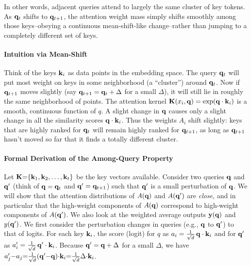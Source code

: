 In other words, adjacent queries attend to largely the same cluster of key tokens. As $\mathbf{q}_t$ shifts to $\mathbf{q}_{t+1}$, the attention weight mass simply shifts smoothly among those keys–obeying a continuous mean-shift-like change–rather than jumping to a completely different set of keys.

\paragraph{Intuition via Mean-Shift} Think of the keys ${\mathbf{k}_i}$ as data points in the embedding space. The query $\mathbf{q}_t$ will put most weight on keys in some neighborhood (a “cluster”) around $\mathbf{q}_t$. Now if $\mathbf{q}_{t+1}$ moves slightly (say $\mathbf{q}_{t+1} = \mathbf{q}_t + \Delta$ for a small $\Delta$), it will still lie in roughly the same neighborhood of points. The attention kernel $\mathbf{K}(x_i,\mathbf{q}) = \exp(\mathbf{q}\cdot \mathbf{k}_i)$ is a smooth, continuous function of $q$. A slight change in $\mathbf{q}$ causes only a slight change in all the similarity scores $\mathbf{q}\cdot \mathbf{k}_i$. Thus the weights $A_i$ shift slightly: keys that are highly ranked for $\mathbf{q}_t$ will remain highly ranked for $\mathbf{q}_{t+1}$, as long as $\mathbf{q}_{t+1}$ hasn’t moved so far that it finds a totally different cluster.


\paragraph{Formal Derivation of the Among-Query Property}
\label{sec:among-query-def}
Let $\mathbf{K}{=}\{\mathbf{k}_1, \mathbf{k}_2, \dots, \mathbf{k}_t\}$ be the key vectors available. Consider two queries $\mathbf{q}$ and $\mathbf{q}'$ (think of $\mathbf{q} = \mathbf{q}_t$ and $\mathbf{q}' = \mathbf{q}_{t+1}$) such that $\mathbf{q}'$ is a small perturbation of $\mathbf{q}$. We will show that the attention distributions of $A(\mathbf{q})$ and $A(\mathbf{q}')$ are \emph{close}, and in particular that the high-weight components of $A(\mathbf{q})$ correspond to high-weight components of $A(\mathbf{q}')$. We also look at the weighted average outputs $\mathbf{y}(\mathbf{q})$ and $y(\mathbf{q}')$. We first consider the perturbation changes in queries (e.g., $\mathbf{q}$ to $\mathbf{q}'$) to that of logits. For each key $\mathbf{k}_i$, the score (logit) for $q$ as $a_i = \frac{1}{\sqrt{d}} \, \mathbf{q}\cdot \mathbf{k}_i$ and for $\mathbf{q}'$ as $a'_i = \frac{1}{\sqrt{d}} \, \mathbf{q}'\cdot \mathbf{k}_i$. Because $\mathbf{q}' = \mathbf{q} + \Delta$ for a small $\Delta$, we have
$a'_j {-} a_j {=} \frac{1}{\sqrt{d}}(\mathbf{q}' {-} \mathbf{q}){\cdot} \mathbf{k}_i {=} \frac{1}{\sqrt{d}} \Delta {\cdot} \mathbf{k}_i$.


